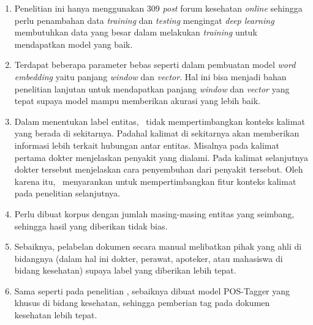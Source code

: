 \begin{enumerate}
  \item Penelitian ini hanya menggunakan 309 \textit{post} forum kesehatan \textit{online} sehingga perlu penambahan data \textit{training} dan \textit{testing} mengingat \textit{deep learning} membutuhkan data yang besar dalam melakukan \textit{training} untuk mendapatkan model yang baik.
  
  \item Terdapat beberapa parameter bebas seperti dalam pembuatan model \textit{word embedding} yaitu panjang \textit{window} dan \textit{vector}. Hal ini bisa menjadi bahan penelitian lanjutan untuk mendapatkan panjang \textit{window} dan \textit{vector} yang tepat supaya model mampu memberikan akurasi yang lebih baik.
  
  \item Dalam menentukan label entitas, \saya~tidak mempertimbangkan konteks kalimat yang berada di sekitarnya. Padahal kalimat di sekitarnya akan memberikan informasi lebih terkait hubungan antar entitas. Misalnya pada kalimat pertama dokter menjelaskan penyakit yang dialami. Pada kalimat selanjutnya dokter tersebut menjelaskan cara penyembuhan dari penyakit tersebut. Oleh karena itu, \saya~menyarankan untuk mempertimbangkan fitur konteks kalimat pada penelitian selanjutnya.
  

  \item Perlu dibuat korpus dengan jumlah masing-masing entitas yang seimbang, sehingga hasil yang diberikan tidak bias.
  
  \item Sebaiknya, pelabelan dokumen secara manual melibatkan pihak yang ahli di bidangnya (dalam hal ini dokter, perawat, apoteker, atau mahasiswa di bidang kesehatan) supaya label yang diberikan lebih tepat.
  
  \item Sama seperti pada penelitian \cite{skripsiKakRadit}, sebaiknya dibuat model POS-Tagger yang khusus di bidang kesehatan, sehingga pemberian tag pada dokumen kesehatan lebih tepat.

\end{enumerate}